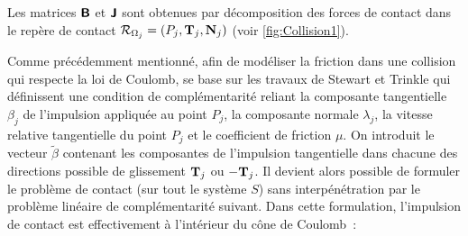 Les matrices $\bm{\mathsf{B}}$ et $\bm{\mathsf{J}}$ sont obtenues par décomposition des forces de contact dans le repère de contact $\mathcal{R}_{\Omega_j} = (P_j, \bm{\mathrm{T}}_j, \bm{\mathrm{N}}_j)$ (voir \cref{fig:Collision1}).

Comme précédemment mentionné, afin de modéliser la friction dans une collision qui respecte la loi de Coulomb, \parencite{rabatel2015thesis} se base sur les travaux de Stewart et Trinkle \parencite{stewart1996implicit} qui définissent une condition de complémentarité reliant la composante tangentielle $\beta_j$ de l'impulsion appliquée au point $P_j$, la composante normale $\lambda_j$, la vitesse relative tangentielle du point $P_j$ et le coefficient de friction $\mu$. On introduit le vecteur $\tilde{\beta}$ contenant les composantes de l'impulsion tangentielle dans chacune des directions possible de glissement $\bm{\mathrm{T}}_j$ ou $-\bm{\mathrm{T}}_j$. Il devient alors possible de formuler le problème de contact (sur tout le système $S$) sans interpénétration par le problème linéaire de complémentarité suivant. Dans cette formulation, l’impulsion de contact est effectivement à l’intérieur du cône de Coulomb :
